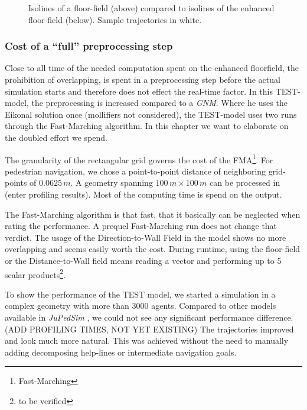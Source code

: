 \begin{figure}[h!]
\caption{Isolines of a floor-field (above) compared to isolines of the enhanced floor-field (below). Sample trajectories in white.}
\label{fig:transformFF}
\end{figure}

\subsubsection{Cost of a ``full'' preprocessing step }

Close to all time of the needed computation spent on the enhanced floorfield, the prohibition of overlapping, is spent in a preprocessing step before the actual simulation starts and therefore does not effect the real-time factor. In this TEST-model, the preprocessing is increased compared to a \emph{GNM}. Where he uses the Eikonal solution once (mollifiers not considered), the TEST-model uses two runs through the Fast-Marching algorithm. In this chapter we want to elaborate on the doubled effort we spend.

The granularity of the rectangular grid governs the cost of the FMA\footnote{Fast-Marching}. For pedestrian navigation, we chose a point-to-point distance of neighboring grid-points of $0.0625\,m$. A geometry spanning $100\,m \times 100\,m$ can be processed in (enter profiling results). Most of the computing time is spend on the output.

The Fast-Marching algorithm is that fast, that it basically can be neglected when rating the performance. A prequel Fast-Marching run does not change that verdict. The usage of the Direction-to-Wall Field in the model shows no more overlapping and seems easily worth the cost. During runtime, using the floor-field or the Distance-to-Wall field means reading a vector and performing up to 5 scalar products\footnote{to be verified}.

To show the performance of the TEST model, we started a simulation in a complex geometry with more than 3000 agents. Compared to other models available in \emph{JuPedSim} \citep{jupedsim}, we could not see any significant performance difference. (ADD PROFILING TIMES, NOT YET EXISTING)
The trajectories improved and look much more natural. This was achieved without the need to manually adding decomposing help-lines or intermediate navigation goals.

